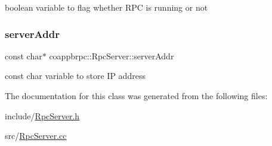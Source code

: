 boolean variable to flag whether R\+PC is running or not \mbox{\label{classcoappbrpc_1_1RpcServer_a14953d39d8e53a7f3dcffde2d15734d0}} 
\subsubsection{\texorpdfstring{server\+Addr}{serverAddr}}
{\footnotesize\ttfamily const char$\ast$ coappbrpc\+::\+Rpc\+Server\+::server\+Addr}

const char variable to store IP address 

The documentation for this class was generated from the following files\+:\begin{DoxyCompactItemize}
\item 
include/\hyperlink{RpcServer_8h}{Rpc\+Server.\+h}\item 
src/\hyperlink{RpcServer_8cc}{Rpc\+Server.\+cc}\end{DoxyCompactItemize}
